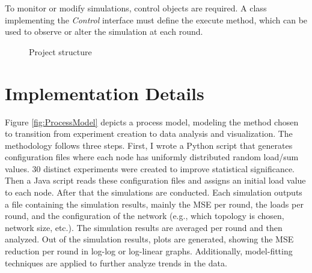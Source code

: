 To monitor or modify simulations, control objects are required. A class implementing the \textit{Control} interface must define the execute method, which can be used to observe or alter the simulation at each round. \cite{peersimdocs}

\begin{figure}
    \centering
    \caption{Project structure}
    \label{fig:uml}
\end{figure}

\section{Implementation Details}\label{sec:implementationdetails}
Figure \ref{fig:ProcessModel} depicts a process model, modeling the method chosen to transition from experiment creation to data analysis and visualization. The methodology follows three steps. First, I wrote a Python script that generates configuration files where each node has uniformly distributed random load/sum values. 30 distinct experiments were created to improve statistical significance. Then a Java script reads these configuration files and assigns an initial load value to each node. After that the simulations are conducted. Each simulation outputs a file containing the simulation results, mainly the MSE per round, the loads per round, and the configuration of the network (e.g., which topology is chosen, network size, etc.). The simulation results are averaged per round and then analyzed. Out of the simulation results, plots are generated, showing the MSE reduction per round in log-log or log-linear graphs. Additionally, model-fitting techniques are applied to further analyze trends in the data.

